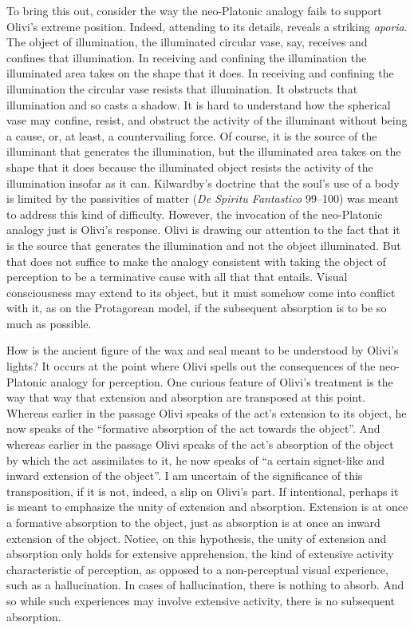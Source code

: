 To bring this out, consider the way the neo-Platonic analogy fails to support Olivi's extreme position. Indeed, attending to its details, reveals a striking \emph{aporia}. The object of illumination, the illuminated circular vase, say, receives and confines that illumination. In receiving and confining the illumination the illuminated area takes on the shape that it does. In receiving and confining the illumination the circular vase resists that illumination. It obstructs that illumination and so casts a shadow. It is hard to understand how the spherical vase may confine, resist, and obstruct the activity of the illuminant without being a cause, or, at least, a countervailing force. Of course, it is the source of the illuminant that generates the illumination, but the illuminated area takes on the shape that it does because the illuminated object resists the activity of the illumination insofar as it can. Kilwardby's doctrine that the soul's use of a body is limited by the passivities of matter (\emph{De Spiritu Fantastico} 99–100) was meant to address this kind of difficulty. However, the invocation of the neo-Platonic analogy just is Olivi's response. Olivi is drawing our attention to the fact that it is the source that generates the illumination and not the object illuminated. But that does not suffice to make the analogy consistent with taking the object of perception to be a terminative cause with all that that entails. Visual consciousness may extend to its object, but it must somehow come into conflict with it, as on the Protagorean model, if the subsequent absorption is to be so much as possible. 

How is the ancient figure of the wax and seal meant to be understood by Olivi's lights? It occurs at the point where Olivi spells out the consequences of the neo-Platonic analogy for perception. One curious feature of Olivi's treatment is the way that way that extension and absorption are transposed at this point. Whereas earlier in the passage Olivi speaks of the act's extension to its object, he now speaks of the ``formative absorption of the act towards the object''. And whereas earlier in the passage Olivi speaks of the act's absorption of the object by which the act assimilates to it, he now speaks of ``a certain signet-like and inward extension of the object''. I am uncertain of the significance of this transposition, if it is not, indeed, a slip on Olivi's part. If intentional, perhaps it is meant to emphasize the unity of extension and absorption. Extension is at once a formative absorption to the object, just as absorption is at once an inward extension of the object. Notice, on this hypothesis, the unity of extension and absorption only holds for extensive apprehension, the kind of extensive activity characteristic of perception, as opposed to a non-perceptual visual experience, such as a hallucination. In cases of hallucination, there is nothing to absorb. And so while such experiences may involve extensive activity, there is no subsequent absorption.

